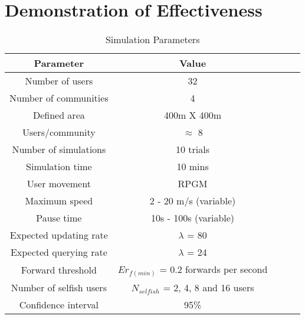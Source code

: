 \section{Demonstration of Effectiveness}\label{Chap6_05}
\begin{table}
\centering
\caption{Simulation Parameters}
\renewcommand{\arraystretch}{1.5}
\begin{tabular}{|l|l|l|l|l|}
\hline
\multicolumn{1}{c}{Parameter} & \multicolumn{1}{c}{Value}\\
\hline
\multicolumn{1}{c}{Number of users} & \multicolumn{1}{c}{32}\\
\multicolumn{1}{c}{Number of communities} & \multicolumn{1}{c}{4} \\
\multicolumn{1}{c}{Defined area } & \multicolumn{1}{c}{400m X 400m} \\
\multicolumn{1}{c}{Users/community} & \multicolumn{1}{c}{$\approx$ 8}\\
\multicolumn{1}{c}{Number of simulations} & \multicolumn{1}{c}{10 trials}\\
\multicolumn{1}{c}{Simulation time} & \multicolumn{1}{c}{10 mins}\\
\multicolumn{1}{c}{User movement} & \multicolumn{1}{c}{RPGM}\\
\multicolumn{1}{c}{Maximum speed} & \multicolumn{1}{c}{2 - 20 m/s (variable)}\\
\multicolumn{1}{c}{Pause time} & \multicolumn{1}{c}{10s - 100s (variable)}\\
\multicolumn{1}{c}{Expected updating rate} & \multicolumn{1}{c}{$\lambda$ = 80}\\
\multicolumn{1}{c}{Expected querying rate} & \multicolumn{1}{c}{$\lambda$ = 24}\\
\multicolumn{1}{c}{Forward threshold} & \multicolumn{1}{c}{$Er_{f(min)}$ = 0.2 forwards per second}\\
\multicolumn{1}{c}{Number of selfish users} & \multicolumn{1}{c}{$N_{selfish}$ = 2, 4, 8 and 16 users}\\
\multicolumn{1}{c}{Confidence interval} & \multicolumn{1}{c}{95\%}\\
\hline
\end{tabular}
\end{table}
